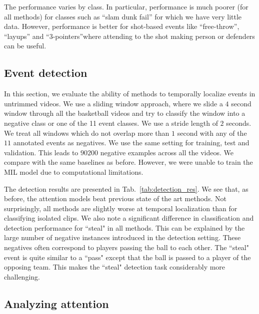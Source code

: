 The performance varies by class.
In particular, performance is much poorer (for all methods) for classes
such as ``slam dunk fail'' for which we have very little data.
However, performance is better for shot-based events like
``free-throw'', ``layups'' and ``3-pointers''where attending to
the shot making person or defenders can be useful. 

\subsection{Event detection}

In this section, we evaluate the ability of methods to temporally localize
events in untrimmed videos.  We use a sliding window approach, where we slide a
$4$ second window through all the basketball videos and try to classify the
window into a negative class or one of the 11 event classes. We use a stride
length of $2$ seconds.  We treat all windows which do not overlap more than $1$
second with any of the $11$ annotated events as negatives. We use the same setting
for training, test and validation.  This leads to $90200$ negative examples
across all the videos.  We compare with the same baselines as before. However,
we were unable to train the MIL model due to computational limitations.

The detection results are presented in Tab.~\ref{tab:detection_res}.  We see
that, as before, the attention models beat previous state of the art methods.
Not surprisingly, all methods are slightly worse at temporal localization than
for classifying isolated clips.  We also note a significant
difference in classification and detection performance for ``steal" in all
methods.  This can be explained by the large number of negative instances
introduced in the detection setting. These negatives often correspond to
players passing the ball to each other. The ``steal" event is quite similar to
a ``pass" except that the ball is passed to a player of the opposing team. This
makes the ``steal" detection task considerably more challenging.

\subsection{Analyzing attention}

